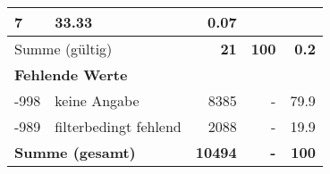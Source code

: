\begin{longtable}{lXrrr}
       \num{7} &
       \num[round-mode=places,round-precision=2]{33.33} &
         \num[round-mode=places,round-precision=2]{0.07} \\
     \midrule
     \multicolumn{2}{l}{Summe (gültig)} &
       \textbf{\num{21}} &
     \textbf{\num{100}} &
       \textbf{\num[round-mode=places,round-precision=2]{0.2}} \\
     \multicolumn{5}{l}{\textbf{Fehlende Werte}}\\
       -998 &
       keine Angabe &
         \num{8385} &
        - &
         \num[round-mode=places,round-precision=2]{79.9} \\
       -989 &
       filterbedingt fehlend &
         \num{2088} &
        - &
         \num[round-mode=places,round-precision=2]{19.9} \\
     \midrule
     \multicolumn{2}{l}{\textbf{Summe (gesamt)}} &
          \textbf{\num{10494}} &
        \textbf{-} &
        \textbf{\num{100}} \\
     \bottomrule
     \end{longtable}
     
